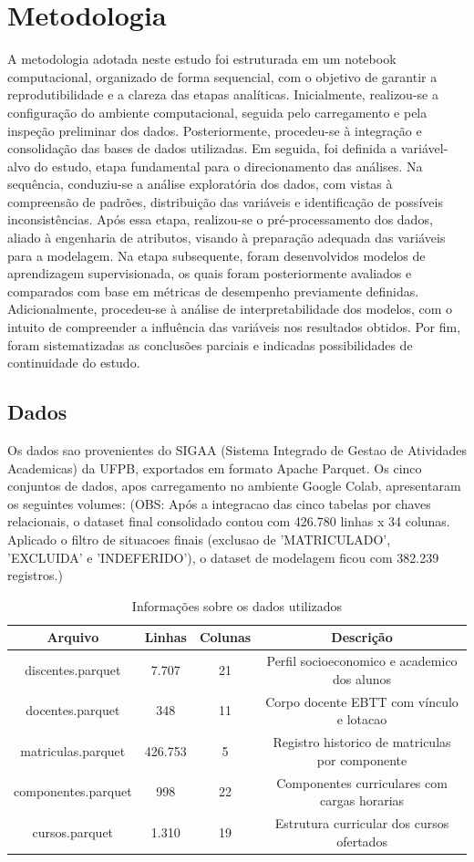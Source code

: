 \chapter{Metodologia}
A metodologia adotada neste estudo foi estruturada em um notebook computacional, organizado de forma sequencial, com o objetivo de garantir a reprodutibilidade e a clareza das etapas analíticas. Inicialmente, realizou-se a configuração do ambiente computacional, seguida pelo carregamento e pela inspeção preliminar dos dados. Posteriormente, procedeu-se à integração e consolidação das bases de dados utilizadas. Em seguida, foi definida a variável-alvo do estudo, etapa fundamental para o direcionamento das análises. Na sequência, conduziu-se a análise exploratória dos dados, com vistas à compreensão de padrões, distribuição das variáveis e identificação de possíveis inconsistências. Após essa etapa, realizou-se o pré-processamento dos dados, aliado à engenharia de atributos, visando à preparação adequada das variáveis para a modelagem. Na etapa subsequente, foram desenvolvidos modelos de aprendizagem supervisionada, os quais foram posteriormente avaliados e comparados com base em métricas de desempenho previamente definidas. Adicionalmente, procedeu-se à análise de interpretabilidade dos modelos, com o intuito de compreender a influência das variáveis nos resultados obtidos. Por fim, foram sistematizadas as conclusões parciais e indicadas possibilidades de continuidade do estudo.


\section{Dados}
Os dados sao provenientes do SIGAA (Sistema Integrado de Gestao de Atividades Academicas) da UFPB, exportados em formato Apache Parquet. Os cinco conjuntos de dados, apos carregamento no ambiente Google Colab, apresentaram os seguintes volumes:
(OBS: Após a integracao das cinco tabelas por chaves relacionais, o dataset final consolidado contou com 426.780 linhas x 34 colunas. Aplicado o filtro de situacoes finais (exclusao de 'MATRICULADO', 'EXCLUIDA' e 'INDEFERIDO'), o dataset de modelagem ficou com 382.239 registros.)

\begin{table}[h]
\centering
\caption{Informações sobre os dados utilizados}
\begin{tabular}{|c|c|c|c|}
\hline
Arquivo & Linhas & Colunas & Descrição \\ 
\hline
discentes.parquet & 7.707 & 21 & Perfil socioeconomico e academico dos alunos \\
docentes.parquet & 348 & 11 & Corpo docente EBTT com vínculo e lotacao \\
matriculas.parquet & 426.753 & 5 & Registro historico de matriculas por componente \\
componentes.parquet & 998 & 22 & Componentes curriculares com cargas horarias \\
cursos.parquet & 1.310 & 19 & Estrutura curricular dos cursos ofertados \\ 
\hline
\end{tabular}
\label{tab:exemplo}
\end{table}

